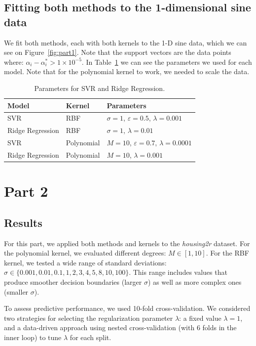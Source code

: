 \documentclass[9pt]{IEEEtran}
\begin{document}
\subsection{Fitting both methods to the 1-dimensional sine data}
We fit both methods, each with both kernels to the 1-D sine data, 
which we can see on Figure~\ref{fig:part1}. Note that the
 support vectors are the data points
  where: \( \alpha_i - \alpha_i^* > 1 \times 10^{-5} \).
   In Table~\ref{tab:parameters} we can see
the parameters we used for each model. Note that for the polynomial kernel to
work, we needed to scale the data.

\begin{table}[h]
\centering
\begin{tabular}{l|l|l}
Model & Kernel & Parameters \\
\hline
SVR & RBF & $\sigma=1$, $\varepsilon=0.5$, $\lambda=0.001$ \\
Ridge Regression & RBF & $\sigma=1$, $\lambda=0.01$ \\
SVR & Polynomial & $M=10$, $\varepsilon=0.7$, $\lambda=0.0001$ \\
Ridge Regression & Polynomial & $M=10$, $\lambda=0.001$ \\
\end{tabular}
\vspace{2pt}
\caption{Parameters for SVR and Ridge Regression.}
\label{tab:parameters}
\end{table}



\newpage
\section{Part 2}
\subsection{Results}
For this part, we applied both methods and kernels to
 the \textit{housing2r} dataset.  
For the polynomial kernel, we evaluated different degrees: \( M \in [1, 10] \).  
For the RBF kernel, we tested a wide range of standard deviations:  
\( \sigma \in \{0.001, 0.01, 0.1, 1, 2, 3, 4, 5, 8, 10, 100\} \). This
 range includes values that produce smoother decision boundaries 
(larger \(\sigma\)) as well as more complex ones (smaller \(\sigma\)).

To assess predictive performance, we used 10-fold cross-validation. 
We considered two strategies for selecting the regularization parameter
 \(\lambda\): a fixed value \(\lambda = 1\), and a data-driven approach 
 using nested cross-validation (with 6 folds in the inner loop) to tune 
 \(\lambda\) for each split.
\end{document}
